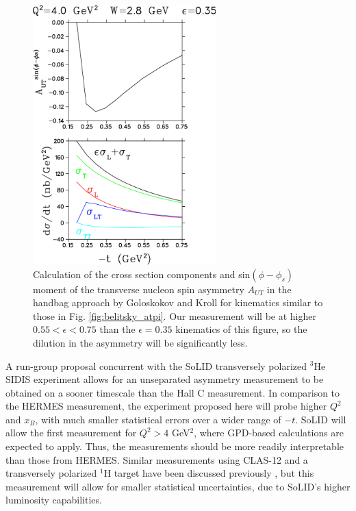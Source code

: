 \begin{figure}[hbt!]
\begin{center}
\includegraphics[height=10cm]{./figures/goloskokov2.png}
\caption{\label{fig:golo_aut}
Calculation of the cross section components and sin$(\phi-\phi_s)$ moment of
the transverse nucleon spin asymmetry $A_{UT}$ in the handbag approach by
Goloskokov and Kroll \cite{GoPC} for kinematics similar to those in
Fig. \ref{fig:belitsky_atpi}.  Our measurement will be at higher
$0.55<\epsilon<0.75$ than the $\epsilon=0.35$ kinematics of this figure,
so the dilution in the asymmetry will be significantly less.}
\end{center}
\end{figure}

A run-group proposal concurrent with the SoLID transversely polarized $^3$He
SIDIS experiment allows for an unseparated asymmetry measurement to be obtained
on a sooner timescale than the Hall C measurement.  In comparison to the HERMES
measurement, the experiment proposed here will probe higher $Q^2$ and $x_B$,
with much smaller statistical errors over a wider range of $-t$.
SoLID will allow the first measurement for $Q^2>4$ GeV$^2$, where GPD-based
calculations are expected to apply.  Thus, the measurements should be more
readily interpretable than those from HERMES.  Similar measurements using
CLAS-12 and a transversely polarized $^1$H target have been discussed
previously \cite{clas}, but this measurement will allow for smaller statistical
uncertainties, due to SoLID's higher luminosity capabilities.

